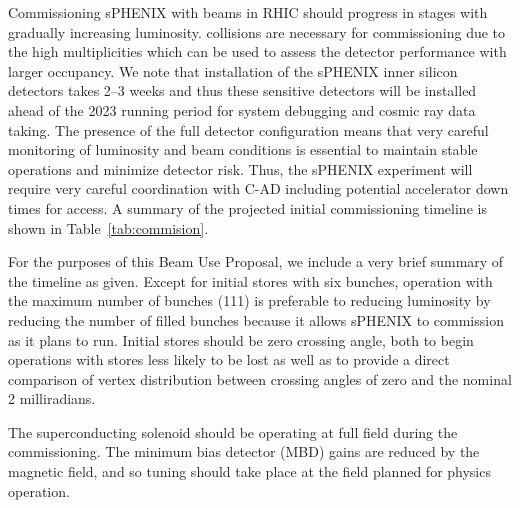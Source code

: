 Commissioning sPHENIX with beams in RHIC should progress in stages
with gradually increasing luminosity.  \auau collisions are necessary
for commissioning due to the high multiplicities which can be used to
assess the detector performance with larger occupancy.  We note that
installation of the sPHENIX inner silicon detectors takes 2--3 weeks
and thus these sensitive detectors will be installed ahead of the 2023
running period for system debugging and cosmic ray data taking.  The
presence of the full detector configuration means that very careful
monitoring of luminosity and beam conditions is essential to maintain
stable operations and minimize detector risk.  Thus, the sPHENIX
experiment will require very careful coordination with C-AD including
potential accelerator down times for access.  A summary of the
projected initial commissioning timeline is shown in
Table~\ref{tab:commision}.


For the purposes of this Beam Use Proposal, we include a very brief
summary of the timeline as given.  Except for initial stores with six
bunches, operation with the maximum number of bunches (111) is
preferable to reducing luminosity by reducing the number of filled
bunches because it allows sPHENIX to commission as it plans to run.
Initial stores should be zero crossing angle, both to begin operations
with stores less likely to be lost as well as to provide a direct
comparison of vertex distribution between crossing angles of zero and
the nominal 2 milliradians.

The superconducting solenoid should be operating at full field during
the commissioning.  The minimum bias detector (MBD) gains are reduced
by the magnetic field, and so tuning should take place at the field
planned for physics operation.

